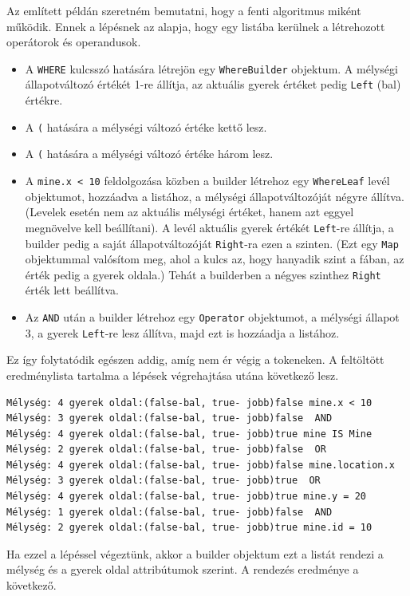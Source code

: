 Az említett példán szeretném bemutatni, hogy a fenti algoritmus miként működik. Ennek a lépésnek az alapja, hogy egy listába kerülnek a létrehozott operátorok és operandusok.

\begin{itemize}
\item A \texttt{WHERE} kulcsszó hatására létrejön egy \texttt{WhereBuilder} objektum. A mélységi állapotváltozó értékét 1-re állítja, az aktuális gyerek értéket pedig \texttt{Left} (bal) értékre.
\item A \texttt{(} hatására a mélységi változó értéke kettő lesz.
\item A \texttt{(} hatására a mélységi változó értéke három lesz.
\item A \texttt{mine.x < 10} feldolgozása közben a builder létrehoz egy \texttt{WhereLeaf} levél objektumot, hozzáadva a listához, a mélységi állapotváltozóját négyre állítva. (Levelek esetén nem az aktuális mélységi értéket, hanem azt eggyel megnövelve kell beállítani). A levél aktuális gyerek értékét \texttt{Left}-re állítja, a builder pedig a saját állapotváltozóját \texttt{Right}-ra ezen a szinten. (Ezt egy \texttt{Map} objektummal valósítom meg, ahol a kulcs az, hogy hanyadik szint a fában, az érték pedig a gyerek oldala.) Tehát a builderben a négyes szinthez \texttt{Right} érték lett beállítva.
\item Az \texttt{AND} után a builder létrehoz egy \texttt{Operator} objektumot, a mélységi állapot 3, a gyerek \texttt{Left}-re lesz állítva, majd ezt is hozzáadja a listához.
\end{itemize}

Ez így folytatódik egészen addig, amíg nem ér végig a tokeneken. A feltöltött eredménylista tartalma a lépések végrehajtása utána következő lesz.

\begin{verbatim}
Mélység: 4 gyerek oldal:(false-bal, true- jobb)false mine.x < 10
Mélység: 3 gyerek oldal:(false-bal, true- jobb)false  AND
Mélység: 4 gyerek oldal:(false-bal, true- jobb)true mine IS Mine 
Mélység: 2 gyerek oldal:(false-bal, true- jobb)false  OR
Mélység: 4 gyerek oldal:(false-bal, true- jobb)false mine.location.x 
Mélység: 3 gyerek oldal:(false-bal, true- jobb)true  OR
Mélység: 4 gyerek oldal:(false-bal, true- jobb)true mine.y = 20 
Mélység: 1 gyerek oldal:(false-bal, true- jobb)false  AND
Mélység: 2 gyerek oldal:(false-bal, true- jobb)true mine.id = 10 
\end{verbatim}

Ha ezzel a lépéssel végeztünk, akkor a builder objektum ezt a listát rendezi a mélység és a gyerek oldal attribútumok szerint. A rendezés eredménye a következő.

